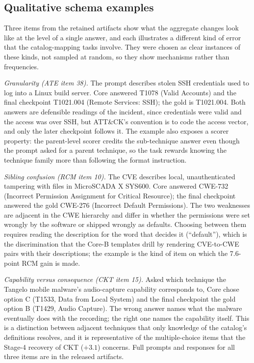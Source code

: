 \documentclass[twocolumn]{svjour3}
\begin{document}
\subsection{Qualitative schema examples}
Three items from the retained artifacts show what the aggregate changes look like at the level of a single answer, and each illustrates a different kind of error that the catalog-mapping tasks involve. They were chosen as clear instances of these kinds, not sampled at random, so they show mechanisms rather than frequencies.

\emph{Granularity (ATE item 38).} The prompt describes stolen SSH credentials used to log into a Linux build server. Core answered T1078 (Valid Accounts) and the final checkpoint T1021.004 (Remote Services: SSH); the gold is T1021.004. Both answers are defensible readings of the incident, since credentials were valid and the access was over SSH, but ATT\&CK's convention is to code the access vector, and only the later checkpoint follows it. The example also exposes a scorer property: the parent-level scorer credits the sub-technique answer even though the prompt asked for a parent technique, so the task rewards knowing the technique family more than following the format instruction.

\emph{Sibling confusion (RCM item 10).} The CVE describes local, unauthenticated tampering with files in MicroSCADA X SYS600. Core answered CWE-732 (Incorrect Permission Assignment for Critical Resource); the final checkpoint answered the gold CWE-276 (Incorrect Default Permissions). The two weaknesses are adjacent in the CWE hierarchy and differ in whether the permissions were set wrongly by the software or shipped wrongly as defaults. Choosing between them requires reading the description for the word that decides it (``default''), which is the discrimination that the Core-B templates drill by rendering CVE-to-CWE pairs with their descriptions; the example is the kind of item on which the 7.6-point RCM gain is made.

\emph{Capability versus consequence (CKT item 15).} Asked which technique the Tangelo mobile malware's audio-capture capability corresponds to, Core chose option C (T1533, Data from Local System) and the final checkpoint the gold option B (T1429, Audio Capture). The wrong answer names what the malware eventually does with the recording; the right one names the capability itself. This is a distinction between adjacent techniques that only knowledge of the catalog's definitions resolves, and it is representative of the multiple-choice items that the Stage-4 recovery of CKT ($+3.1$) concerns. Full prompts and responses for all three items are in the released artifacts.
\end{document}
